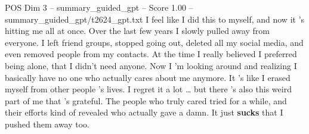 \begin{textsample}{POS Dim 3 – summary\_guided\_gpt – Score 1.00 – summary\_guided\_gpt/t2624\_gpt.txt}  \label{ex:f3_pos_029}
I feel like I did this to myself, and now it ’s hitting me all at once.
Over the last few years I slowly pulled away from everyone.
I left friend groups, stopped going out, deleted all my social media, and even removed people from my contacts.
At the time I really believed I preferred being alone, that I didn't need anyone.
Now I ’m looking around and realizing I basically have no one who actually cares about me anymore.
It ’s like I erased myself from other people ’s lives.
I regret it a lot … but there ’s also this weird part of me that ’s grateful.
The people who truly cared tried for a while, and their efforts kind of revealed who actually gave a damn.
It just \textbf{sucks} that I pushed them away too.

\end{textsample}
